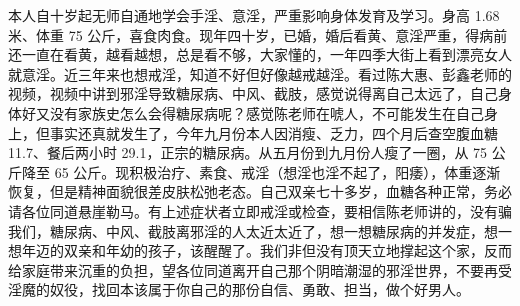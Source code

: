 \begin{case}
    本人自十岁起无师自通地学会手淫、意淫，严重影响身体发育及学习。身高 1.68 米、体重 75 公斤，喜食肉食。现年四十岁，已婚，婚后看黄、意淫严重，得病前还一直在看黄，越看越想，总是看不够，大家懂的，一年四季大街上看到漂亮女人就意淫。近三年来也想戒淫，知道不好但好像越戒越淫。看过陈大惠、彭鑫老师的视频，视频中讲到邪淫导致糖尿病、中风、截肢，感觉说得离自己太远了，自己身体好又没有家族史怎么会得糖尿病呢？感觉陈老师在唬人，不可能发生在自己身上，但事实还真就发生了，今年九月份本人因消瘦、乏力，四个月后查空腹血糖 11.7、餐后两小时 29.1，正宗的糖尿病。从五月份到九月份人瘦了一圈，从 75 公斤降至 65 公斤。现积极治疗、素食、戒淫（想淫也淫不起了，阳痿），体重逐渐恢复，但是精神面貌很差皮肤松弛老态。自己双亲七十多岁，血糖各种正常，务必请各位同道悬崖勒马。有上述症状者立即戒淫或检查，要相信陈老师讲的，没有骗我们，糖尿病、中风、截肢离邪淫的人太近太近了，想一想糖尿病的并发症，想一想年迈的双亲和年幼的孩子，该醒醒了。我们非但没有顶天立地撑起这个家，反而给家庭带来沉重的负担，望各位同道离开自己那个阴暗潮湿的邪淫世界，不要再受淫魔的奴役，找回本该属于你自己的那份自信、勇敢、担当，做个好男人。

\end{case}

